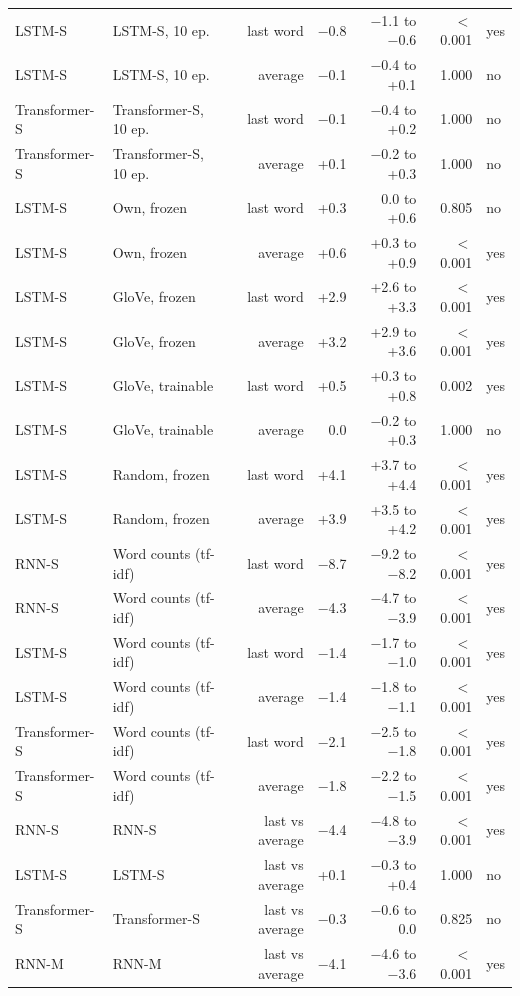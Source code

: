 \begin{tabular}{@{}llrrrrl@{}}
LSTM-S & LSTM-S, 10 ep. & last word & $-$0.8 & $-$1.1 to $-$0.6 & $<$0.001 & yes \\
LSTM-S & LSTM-S, 10 ep. & average & $-$0.1 & $-$0.4 to +0.1 & 1.000 & no \\
Transformer-S & Transformer-S, 10 ep. & last word & $-$0.1 & $-$0.4 to +0.2 & 1.000 & no \\
Transformer-S & Transformer-S, 10 ep. & average & +0.1 & $-$0.2 to +0.3 & 1.000 & no \\
LSTM-S & Own, frozen & last word & +0.3 & 0.0 to +0.6 & 0.805 & no \\
LSTM-S & Own, frozen & average & +0.6 & +0.3 to +0.9 & $<$0.001 & yes \\
LSTM-S & GloVe, frozen & last word & +2.9 & +2.6 to +3.3 & $<$0.001 & yes \\
LSTM-S & GloVe, frozen & average & +3.2 & +2.9 to +3.6 & $<$0.001 & yes \\
LSTM-S & GloVe, trainable & last word & +0.5 & +0.3 to +0.8 & 0.002 & yes \\
LSTM-S & GloVe, trainable & average & 0.0 & $-$0.2 to +0.3 & 1.000 & no \\
LSTM-S & Random, frozen & last word & +4.1 & +3.7 to +4.4 & $<$0.001 & yes \\
LSTM-S & Random, frozen & average & +3.9 & +3.5 to +4.2 & $<$0.001 & yes \\
RNN-S & Word counts (tf-idf) & last word & $-$8.7 & $-$9.2 to $-$8.2 & $<$0.001 & yes \\
RNN-S & Word counts (tf-idf) & average & $-$4.3 & $-$4.7 to $-$3.9 & $<$0.001 & yes \\
LSTM-S & Word counts (tf-idf) & last word & $-$1.4 & $-$1.7 to $-$1.0 & $<$0.001 & yes \\
LSTM-S & Word counts (tf-idf) & average & $-$1.4 & $-$1.8 to $-$1.1 & $<$0.001 & yes \\
Transformer-S & Word counts (tf-idf) & last word & $-$2.1 & $-$2.5 to $-$1.8 & $<$0.001 & yes \\
Transformer-S & Word counts (tf-idf) & average & $-$1.8 & $-$2.2 to $-$1.5 & $<$0.001 & yes \\
RNN-S & RNN-S & last vs average & $-$4.4 & $-$4.8 to $-$3.9 & $<$0.001 & yes \\
LSTM-S & LSTM-S & last vs average & +0.1 & $-$0.3 to +0.4 & 1.000 & no \\
Transformer-S & Transformer-S & last vs average & $-$0.3 & $-$0.6 to 0.0 & 0.825 & no \\
RNN-M & RNN-M & last vs average & $-$4.1 & $-$4.6 to $-$3.6 & $<$0.001 & yes \\

\end{tabular}
